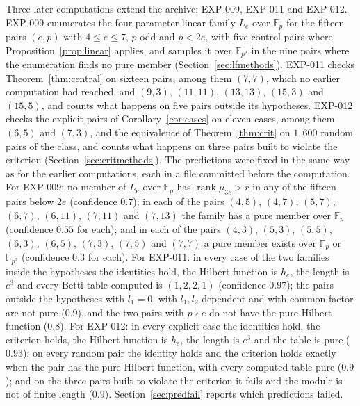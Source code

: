 \documentclass[11pt]{article}
\theoremstyle{definition}
\theoremstyle{remark}
\newcommand{\EXP}[1]{\mbox{EXP-#1}}
\newcommand{\F}{\mathbb{F}}
\begin{document}
Three later computations extend the archive: \EXP{009}, \EXP{011} and \EXP{012}. \EXP{009} enumerates the four-parameter linear family $L_e$ over $\F_p$ for the fifteen pairs $(e,p)$ with $4\le e\le7$, $p$ odd and $p<2e$, with five control pairs where Proposition~\ref{prop:linear} applies, and samples it over $\F_{p^2}$ in the nine pairs where the enumeration finds no pure member (Section~\ref{sec:lfmethods}). \EXP{011} checks Theorem~\ref{thm:central} on sixteen pairs, among them $(7,7)$, which no earlier computation had reached, and $(9,3)$, $(11,11)$, $(13,13)$, $(15,3)$ and $(15,5)$, and counts what happens on five pairs outside its hypotheses. \EXP{012} checks the explicit pairs of Corollary~\ref{cor:cases} on eleven cases, among them $(6,5)$ and $(7,3)$, and the equivalence of Theorem~\ref{thm:crit} on $1{,}600$ random pairs of the class, and counts what happens on three pairs built to violate the criterion (Section~\ref{sec:critmethods}). The predictions were fixed in the same way as for the earlier computations, each in a file committed before the computation. For \EXP{009}: no member of $L_e$ over $\F_p$ has $\operatorname{rank}\mu_{3e}>r$ in any of the fifteen pairs below $2e$ (confidence $0.7$); in each of the pairs $(4,5)$, $(4,7)$, $(5,7)$, $(6,7)$, $(6,11)$, $(7,11)$ and $(7,13)$ the family has a pure member over $\F_p$ (confidence $0.55$ for each); and in each of the pairs $(4,3)$, $(5,3)$, $(5,5)$, $(6,3)$, $(6,5)$, $(7,3)$, $(7,5)$ and $(7,7)$ a pure member exists over $\F_p$ or $\F_{p^2}$ (confidence $0.3$ for each). For \EXP{011}: in every case of the two families inside the hypotheses the identities hold, the Hilbert function is $h_e$, the length is $e^3$ and every Betti table computed is $(1,2,2,1)$ (confidence $0.97$); the pairs outside the hypotheses with $l_1=0$, with $l_1,l_2$ dependent and with common factor are not pure ($0.9$), and the two pairs with $p\nmid e$ do not have the pure Hilbert function ($0.8$). For \EXP{012}: in every explicit case the identities hold, the criterion holds, the Hilbert function is $h_e$, the length is $e^3$ and the table is pure ($0.93$); on every random pair the identity holds and the criterion holds exactly when the pair has the pure Hilbert function, with every computed table pure ($0.9$); and on the three pairs built to violate the criterion it fails and the module is not of finite length ($0.9$). Section~\ref{sec:predfail} reports which predictions failed.
\end{document}

